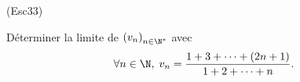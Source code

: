 \begin{tiny}(Esc33)\end{tiny} Déterminer la limite de $\left( v_n \right)_{n \in \N^*}$ avec
\[
 \forall n \in \N, \;
 v_n = \frac{1+3+\cdots +(2n+1)}{1+2+\cdots+n}.
\]

